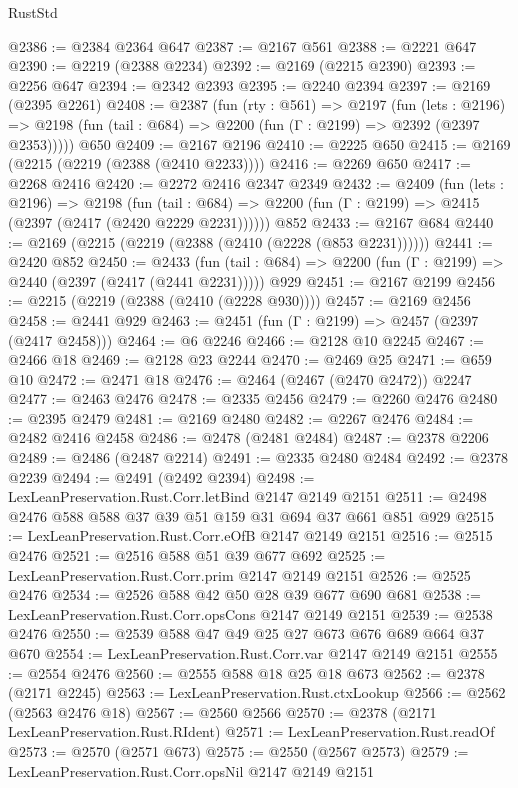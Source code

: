 \begin{lexlean}{RustStd}
\begin{coremodule}
{\begin{coremodule}
{{{{{{{{{{{{{{{@2386 := @2384 @2364 @647
@2387 := @2167 @561
@2388 := @2221 @647
@2390 := @2219 (@2388 @2234)
@2392 := @2169 (@2215 @2390)
@2393 := @2256 @647
@2394 := @2342 @2393
@2395 := @2240 @2394
@2397 := @2169 (@2395 @2261)
@2408 := @2387
    (fun (rty : @561) =>
    @2197
      (fun (lets : @2196) =>
      @2198 (fun (tail : @684) => @2200 (fun (Γ : @2199) => @2392 (@2397 @2353)))))
    @650
@2409 := @2167 @2196
@2410 := @2225 @650
@2415 := @2169 (@2215 (@2219 (@2388 (@2410 @2233))))
@2416 := @2269 @650
@2417 := @2268 @2416
@2420 := @2272 @2416 @2347 @2349
@2432 := @2409
    (fun (lets : @2196) =>
    @2198
      (fun (tail : @684) => @2200 (fun (Γ : @2199) => @2415 (@2397 (@2417 (@2420 @2229 @2231))))))
    @852
@2433 := @2167 @684
@2440 := @2169 (@2215 (@2219 (@2388 (@2410 (@2228 (@853 @2231))))))
@2441 := @2420 @852
@2450 := @2433
    (fun (tail : @684) => @2200 (fun (Γ : @2199) => @2440 (@2397 (@2417 (@2441 @2231)))))
    @929
@2451 := @2167 @2199
@2456 := @2215 (@2219 (@2388 (@2410 (@2228 @930))))
@2457 := @2169 @2456
@2458 := @2441 @929
@2463 := @2451 (fun (Γ : @2199) => @2457 (@2397 (@2417 @2458)))
@2464 := @6 @2246
@2466 := @2128 @10 @2245
@2467 := @2466 @18
@2469 := @2128 @23 @2244
@2470 := @2469 @25
@2471 := @659 @10
@2472 := @2471 @18
@2476 := @2464 (@2467 (@2470 @2472)) @2247
@2477 := @2463 @2476
@2478 := @2335 @2456
@2479 := @2260 @2476
@2480 := @2395 @2479
@2481 := @2169 @2480
@2482 := @2267 @2476
@2484 := @2482 @2416 @2458
@2486 := @2478 (@2481 @2484)
@2487 := @2378 @2206
@2489 := @2486 (@2487 @2214)
@2491 := @2335 @2480 @2484
@2492 := @2378 @2239
@2494 := @2491 (@2492 @2394)
@2498 := LexLeanPreservation.Rust.Corr.letBind @2147 @2149 @2151
@2511 := @2498 @2476 @588 @588 @37 @39 @51 @159 @31 @694 @37 @661 @851 @929
@2515 := LexLeanPreservation.Rust.Corr.eOfB @2147 @2149 @2151
@2516 := @2515 @2476
@2521 := @2516 @588 @51 @39 @677 @692
@2525 := LexLeanPreservation.Rust.Corr.prim @2147 @2149 @2151
@2526 := @2525 @2476
@2534 := @2526 @588 @42 @50 @28 @39 @677 @690 @681
@2538 := LexLeanPreservation.Rust.Corr.opsCons @2147 @2149 @2151
@2539 := @2538 @2476
@2550 := @2539 @588 @47 @49 @25 @27 @673 @676 @689 @664 @37 @670
@2554 := LexLeanPreservation.Rust.Corr.var @2147 @2149 @2151
@2555 := @2554 @2476
@2560 := @2555 @588 @18 @25 @18 @673
@2562 := @2378 (@2171 @2245)
@2563 := LexLeanPreservation.Rust.ctxLookup
@2566 := @2562 (@2563 @2476 @18)
@2567 := @2560 @2566
@2570 := @2378 (@2171 LexLeanPreservation.Rust.RIdent)
@2571 := LexLeanPreservation.Rust.readOf
@2573 := @2570 (@2571 @673)
@2575 := @2550 (@2567 @2573)
@2579 := LexLeanPreservation.Rust.Corr.opsNil @2147 @2149 @2151
}}}}}}}}}}}}}}}
\end{coremodule}}
\end{coremodule}
\end{lexlean}
